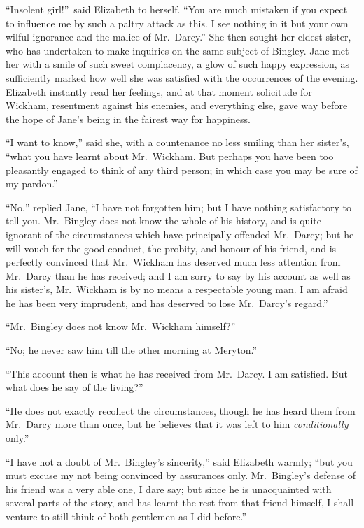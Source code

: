 \documentclass[12pt,english,oneside]{book}
\begin{document}
{}``Insolent girl!''\ said Elizabeth to herself. {}``You are much
mistaken if you expect to influence me by such a paltry attack as
this. I see nothing in it but your own wilful ignorance and the malice
of Mr.\ Darcy.'' She then sought her eldest sister, who has undertaken
to make inquiries on the same subject of Bingley. Jane met her with
a smile of such sweet complacency, a glow of such happy expression,
as sufficiently marked how well she was satisfied with the occurrences
of the evening. Elizabeth instantly read her feelings, and at that
moment solicitude for Wickham, resentment against his enemies, and
everything else, gave way before the hope of Jane's being in the fairest
way for happiness.

{}``I want to know,'' said she, with a countenance no less smiling
than her sister's, {}``what you have learnt about Mr.\ Wickham.
But perhaps you have been too pleasantly engaged to think of any third
person; in which case you may be sure of my pardon.''

{}``No,'' replied Jane, {}``I have not forgotten him; but I have
nothing satisfactory to tell you. Mr.\ Bingley does not know the
whole of his history, and is quite ignorant of the circumstances which
have principally offended Mr.\ Darcy; but he will vouch for the good
conduct, the probity, and honour of his friend, and is perfectly convinced
that Mr.\ Wickham has deserved much less attention from Mr.\ Darcy
than he has received; and I am sorry to say by his account as well
as his sister's, Mr.\ Wickham is by no means a respectable young
man. I am afraid he has been very imprudent, and has deserved to lose
Mr.\ Darcy's regard.''

{}``Mr.\ Bingley does not know Mr.\ Wickham himself?''\ 

{}``No; he never saw him till the other morning at Meryton.''

{}``This account then is what he has received from Mr.\ Darcy. I
am satisfied. But what does he say of the living?''\ 

{}``He does not exactly recollect the circumstances, though he has
heard them from Mr.\ Darcy more than once, but he believes that it
was left to him \textit{conditionally} only.''

{}``I have not a doubt of Mr.\ Bingley's sincerity,'' said Elizabeth
warmly; {}``but you must excuse my not being convinced by assurances
only. Mr.\ Bingley's defense of his friend was a very able one, I
dare say; but since he is unacquainted with several parts of the story,
and has learnt the rest from that friend himself, I shall venture
to still think of both gentlemen as I did before.''
\end{document}
